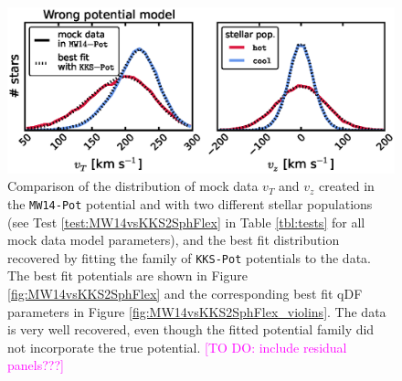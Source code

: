 \documentclass[iop,revtex4]{emulateapj}
\newcommand{\Wilma}[1]{\textcolor{Magenta}{#1}}
\begin{document}
\begin{figure}[!htbp]
\centering
\includegraphics[width=\columnwidth]{figs/MW14vsKKS2SphFlex_mockdata_residuals_3.eps}
\caption{Comparison of the distribution of mock data $v_T$ and $v_z$ created in the \texttt{MW14-Pot} potential and with two different stellar populations (see Test \ref{test:MW14vsKKS2SphFlex} in Table \ref{tbl:tests} for all mock data model parameters), and the best fit distribution recovered by fitting the family of \texttt{KKS-Pot} potentials to the data. The best fit potentials are shown in Figure \ref{fig:MW14vsKKS2SphFlex} and the corresponding best fit qDF parameters in Figure \ref{fig:MW14vsKKS2SphFlex_violins}. The data is very well recovered, even though the fitted potential family did not incorporate the true potential. \Wilma{[TO DO: include residual panels???]}}
\label{fig:MW14vsKKS2SphFlex_mockdata_residuals}
\end{figure}
\end{document}
